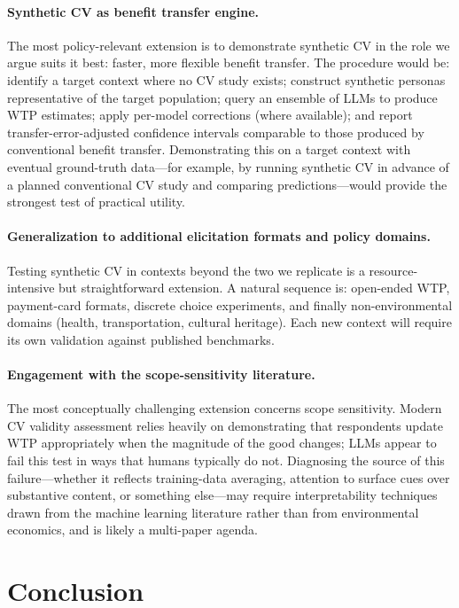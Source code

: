 \documentclass[12pt]{article}
\begin{document}
\paragraph{Synthetic CV as benefit transfer engine.} The most
policy-relevant extension is to demonstrate synthetic CV in the role we
argue suits it best: faster, more flexible benefit transfer. The
procedure would be: identify a target context where no CV study exists;
construct synthetic personas representative of the target population;
query an ensemble of LLMs to produce WTP estimates; apply per-model
corrections (where available); and report transfer-error-adjusted
confidence intervals comparable to those produced by conventional
benefit transfer. Demonstrating this on a target context with eventual
ground-truth data---for example, by running synthetic CV in advance of
a planned conventional CV study and comparing predictions---would
provide the strongest test of practical utility.

\paragraph{Generalization to additional elicitation formats and policy
domains.} Testing synthetic CV in contexts beyond the two we replicate
is a resource-intensive but straightforward extension. A natural
sequence is: open-ended WTP, payment-card formats, discrete choice
experiments, and finally non-environmental domains (health,
transportation, cultural heritage). Each new context will require its
own validation against published benchmarks.

\paragraph{Engagement with the scope-sensitivity literature.} The most
conceptually challenging extension concerns scope sensitivity. Modern
CV validity assessment relies heavily on demonstrating that respondents
update WTP appropriately when the magnitude of the good changes; LLMs
appear to fail this test in ways that humans typically do not.
Diagnosing the source of this failure---whether it reflects
training-data averaging, attention to surface cues over substantive
content, or something else---may require interpretability techniques
drawn from the machine learning literature rather than from
environmental economics, and is likely a multi-paper agenda.


\section{Conclusion}\label{sec:conclusion}
\end{document}
